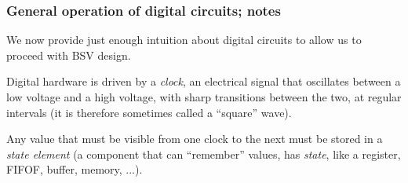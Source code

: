 \begin{frame}
\frametitle{General operation of digital circuits; notes}

We now provide just enough intuition about digital circuits to allow
us to proceed with BSV design.

\vspace*{5ex}

Digital hardware is driven by a \emph{clock}, an electrical signal
that oscillates between a low voltage and a high voltage, with sharp
transitions between the two, at regular intervals (it is therefore
sometimes called a ``square'' wave).

\vspace{1ex}

\begin{center}
\end{center}

\vspace{1ex}

Any value that must be visible from one clock to the next must be
stored in a \emph{state element} (a component that can ``remember''
values, {\ie} has \emph{state}, like a register, FIFOF, buffer,
memory, ...).

\end{frame}


